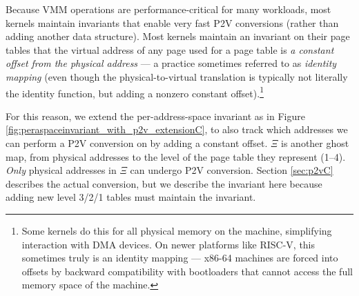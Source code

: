 Because VMM operations are performance-critical for many workloads, most kernels
maintain invariants that enable very fast P2V conversions (rather than adding another data structure).
Most kernels maintain an invariant on their page tables that the virtual address of any page used for a page table 
is \emph{a constant offset from the physical address} --- a practice sometimes referred to as \emph{identity mapping} 
(even though the physical-to-virtual translation
is typically not literally the identity function, but adding a nonzero constant offset).\footnote{Some kernels do this for all physical memory on the machine, simplifying interaction
with DMA devices.
On newer platforms like RISC-V, this sometimes truly is an identity mapping ---
x86-64 machines are forced into offsets by backward compatibility with bootloaders that cannot access the full memory space of the
machine.
}

For this reason, we extend the per-address-space invariant as in Figure \ref{fig:peraspaceinvariant_with_p2v_extensionC}, to also track which
addresses we can perform a P2V conversion on by adding a constant offset.
$\Xi$ is another ghost map, from physical addresses to the level of the page table they represent (1--4).
\emph{Only} physical addresses in $\Xi$ can undergo P2V conversion. 
Section \ref{sec:p2vC} describes the actual conversion,
but we describe the invariant here because adding new level 3/2/1 tables must maintain the invariant.

